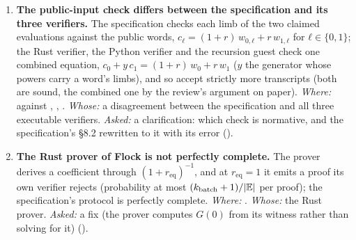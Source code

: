 \begin{sloppypar}
\begin{enumerate}[leftmargin=*, itemsep=5pt]
\item \textbf{The public-input check differs between the specification and its three
  verifiers.} The specification checks each limb of the two claimed evaluations against the
  public words, $c_ℓ = (1 + r)\,w_{0,ℓ} + r\,w_{1,ℓ}$ for $ℓ ∈ \{0, 1\}$; the Rust verifier, the
  Python verifier and the recursion guest check one combined equation,
  $c_0 + y\, c_1 = (1 + r)\, w_0 + r\, w_1$ ($y$ the generator whose powers carry a word's limbs), and so accept strictly more transcripts (both are sound,
  the combined one by the review's argument on paper). \emph{Where:}  against
  , , .
  \emph{Whose:} a disagreement between the specification and all three executable verifiers.
  \emph{Asked:} a clarification: which check is normative, and the specification's §8.2 rewritten
  to it with its error ().

\item \textbf{The Rust prover of Flock is not perfectly complete.} The prover derives a
  coefficient through $(1 + r_{\mathrm{eq}})^{-1}$, and at $r_{\mathrm{eq}} = 1$ it emits a proof
  its own verifier rejects (probability at most $(k_{\mathrm{batch}} + 1)/\lvert \mathbb{E}\rvert$ per proof); the
  specification's protocol is perfectly complete. \emph{Where:}
  . \emph{Whose:} the Rust prover. \emph{Asked:} a fix (the
  prover computes $G(0)$ from its witness rather than solving for it)
  ().


\end{enumerate}
\end{sloppypar}
